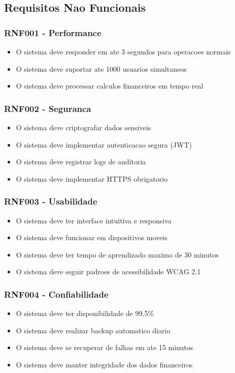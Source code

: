 \subsection{Requisitos Nao Funcionais}

\subsubsection{RNF001 - Performance}
\begin{itemize}
    \item O sistema deve responder em ate 3 segundos para operacoes normais
    \item O sistema deve suportar ate 1000 usuarios simultaneos
    \item O sistema deve processar calculos financeiros em tempo real
\end{itemize}

\subsubsection{RNF002 - Seguranca}
\begin{itemize}
    \item O sistema deve criptografar dados sensiveis
    \item O sistema deve implementar autenticacao segura (JWT)
    \item O sistema deve registrar logs de auditoria
    \item O sistema deve implementar HTTPS obrigatorio
\end{itemize}

\subsubsection{RNF003 - Usabilidade}
\begin{itemize}
    \item O sistema deve ter interface intuitiva e responsiva
    \item O sistema deve funcionar em dispositivos moveis
    \item O sistema deve ter tempo de aprendizado maximo de 30 minutos
    \item O sistema deve seguir padroes de acessibilidade WCAG 2.1
\end{itemize}

\subsubsection{RNF004 - Confiabilidade}
\begin{itemize}
    \item O sistema deve ter disponibilidade de 99.5\%
    \item O sistema deve realizar backup automatico diario
    \item O sistema deve se recuperar de falhas em ate 15 minutos
    \item O sistema deve manter integridade dos dados financeiros
\end{itemize}

